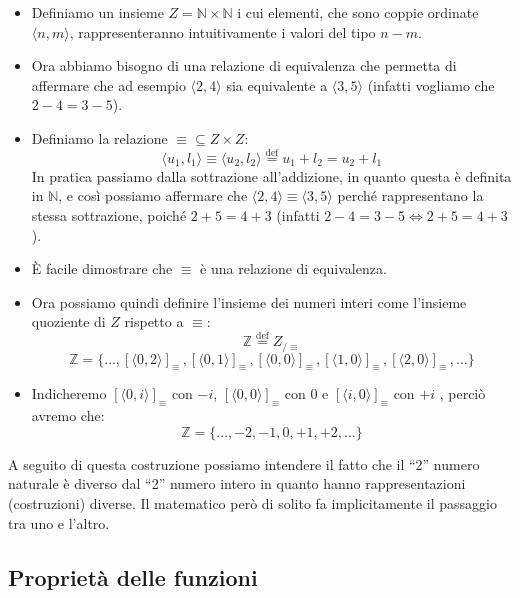 \documentclass[
  a4paper,
]{article}
\providecommand{\tightlist}{%
  \setlength{\itemsep}{0pt}\setlength{\parskip}{0pt}}
\begin{document}
\begin{itemize}
\tightlist
\item
  Definiamo un insieme \(Z = \mathbb{N} \times \mathbb{N}\) i cui
  elementi, che sono coppie ordinate \(\langle n, m \rangle\),
  rappresenteranno intuitivamente i valori del tipo \(n - m\).\\
\item
  Ora abbiamo bisogno di una relazione di equivalenza che permetta di
  affermare che ad esempio \(\langle 2, 4 \rangle\) sia equivalente a
  \(\langle 3, 5 \rangle\) (infatti vogliamo che \(2 - 4 = 3 - 5\)).\\
\item
  Definiamo la relazione \(\equiv \subseteq Z \times Z :\) \[
  \langle u_1, l_1 \rangle \equiv \langle u_2, l_2 \rangle \overset{\mathrm{def}}{=} u_1 + l_2 = u_2 + l_1
  \] In pratica passiamo dalla sottrazione all'addizione, in quanto
  questa è definita in \(\mathbb{N}\), e così possiamo affermare che
  \(\langle 2, 4 \rangle \equiv \langle 3, 5 \rangle\) perché
  rappresentano la stessa sottrazione, poiché \(2 + 5 = 4 + 3\) (infatti
  \(2 - 4 = 3 - 5 \iff 2 + 5 = 4 + 3\)).\\
\item
  È facile dimostrare che \(\equiv\) è una relazione di equivalenza.\\
\item
  Ora possiamo quindi definire l'insieme dei numeri interi come
  l'insieme quoziente di \(Z\) rispetto a \(\equiv\): \[
  \mathbb{Z} \overset{\mathrm{def}}{=} Z_{/\equiv}
  \] \[
  \mathbb{Z} = \{\dots, [\langle0, 2 \rangle]_\equiv \, , [\langle0, 1 \rangle]_\equiv \,, [\langle0,0 \rangle]_\equiv \, , [\langle1, 0 \rangle]_\equiv \, , [\langle2, 0 \rangle]_\equiv \, , \dots \}
  \]
\item
  Indicheremo \([\langle0, i \rangle]_\equiv\) con \(-i\),
  \([\langle0, 0 \rangle]_\equiv\) con \(0\) e
  \([\langle i, 0 \rangle]_\equiv\) con \(+i\) , perciò avremo che: \[
  \mathbb{Z} = \{\dots , -2, -1, 0, +1, +2, \dots \}
  \]
\end{itemize}

A seguito di questa costruzione possiamo intendere il fatto che il ``2''
numero naturale è diverso dal ``2'' numero intero in quanto hanno
rappresentazioni (costruzioni) diverse. Il matematico però di solito fa
implicitamente il passaggio tra uno e l'altro.

\hypertarget{proprietuxe0-delle-funzioni}{%
\subsection{Proprietà delle
funzioni}\label{proprietuxe0-delle-funzioni}}
\end{document}
